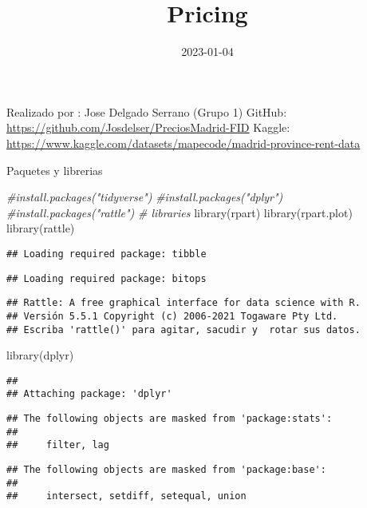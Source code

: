\documentclass[
]{article}
\title{Pricing}
\author{}
\date{\vspace{-2.5em}2023-01-04}
\newenvironment{Shaded}{\begin{snugshade}}{\end{snugshade}}
\newcommand{\CommentTok}[1]{\textcolor[rgb]{0.56,0.35,0.01}{\textit{#1}}}
\newcommand{\FunctionTok}[1]{\textcolor[rgb]{0.00,0.00,0.00}{#1}}
\newcommand{\NormalTok}[1]{#1}
\begin{document}
\maketitle

Realizado por : Jose Delgado Serrano (Grupo 1) GitHub:
\url{https://github.com/Josdelser/PreciosMadrid-FID} Kaggle:
\url{https://www.kaggle.com/datasets/mapecode/madrid-province-rent-data}

Paquetes y librerias

\begin{Shaded}
\begin{Highlighting}[]
\CommentTok{\#install.packages("tidyverse")}
\CommentTok{\#install.packages("dplyr")}
\CommentTok{\#install.packages("rattle")}
\CommentTok{\# libraries}
\FunctionTok{library}\NormalTok{(rpart)}
\FunctionTok{library}\NormalTok{(rpart.plot)}
\FunctionTok{library}\NormalTok{(rattle)}
\end{Highlighting}
\end{Shaded}

\begin{verbatim}
## Loading required package: tibble
\end{verbatim}

\begin{verbatim}
## Loading required package: bitops
\end{verbatim}

\begin{verbatim}
## Rattle: A free graphical interface for data science with R.
## Versión 5.5.1 Copyright (c) 2006-2021 Togaware Pty Ltd.
## Escriba 'rattle()' para agitar, sacudir y  rotar sus datos.
\end{verbatim}

\begin{Shaded}
\begin{Highlighting}[]
\FunctionTok{library}\NormalTok{(dplyr)}
\end{Highlighting}
\end{Shaded}

\begin{verbatim}
## 
## Attaching package: 'dplyr'
\end{verbatim}

\begin{verbatim}
## The following objects are masked from 'package:stats':
## 
##     filter, lag
\end{verbatim}

\begin{verbatim}
## The following objects are masked from 'package:base':
## 
##     intersect, setdiff, setequal, union
\end{verbatim}
\end{document}
